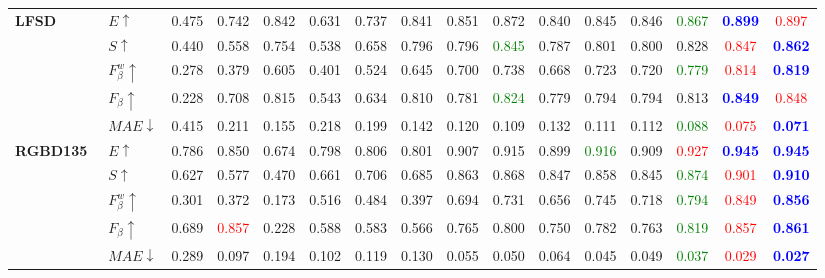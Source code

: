 \documentclass[runningheads]{llncs}
\begin{document}
\begin{table*}[tp]
{\begin{tabular}{lllccccccccccccc}
	\multirow{5}{*}{\textbf{LFSD}~\cite{LFS2017}}
&$E\uparrow$		&0.475	&0.742	&0.842	&0.631	&0.737	&0.841	&0.851	&0.872	&0.840	&0.845	&0.846	&\textcolor{green}{0.867}	&\textbf{\textcolor{blue}{0.899}}	&\textcolor{red}{0.897}\\
&$S\uparrow$	&0.440	&0.558	&0.754	&0.538	&0.658	&0.796	&0.796	&\textcolor{green}{0.845}	&0.787	&0.801	&0.800	&0.828	&\textcolor{red}{0.847}	&\textbf{\textcolor{blue}{0.862}}\\
&$F_{\beta}^w\uparrow$			&0.278	&0.379	&0.605	&0.401	&0.524	&0.645	&0.700	&0.738	&0.668	&0.723	&0.720	&\textcolor{green}{0.779}	&\textcolor{red}{0.814}	&\textbf{\textcolor{blue}{0.819}}\\
&$F_{\beta}\uparrow$	&0.228	&0.708	&0.815	&0.543	&0.634	&0.810	&0.781	&\textcolor{green}{0.824}	&0.779	&0.794	&0.794	&0.813	&\textbf{\textcolor{blue}{0.849}}	&\textcolor{red}{0.848}\\
&$MAE\downarrow$			&0.415	&0.211	&0.155	&0.218	&0.199	&0.142	&0.120	&0.109	&0.132	&0.111	&0.112	&\textcolor{green}{0.088}	&\textcolor{red}{0.075}	&\textbf{\textcolor{blue}{0.071}}\\
									\cmidrule(r){1-16}
	\multirow{5}{*}{\textbf{RGBD135}~\cite{3DDES}}
&$E\uparrow$		&0.786	&0.850	&0.674	&0.798	&0.806	&0.801	&0.907	&0.915	&0.899	&\textcolor{green}{0.916}	&0.909	&\textcolor{red}{0.927}	&\textbf{\textcolor{blue}{0.945}}	&\textbf{\textcolor{blue}{0.945}}\\
&$S\uparrow$	&0.627	&0.577	&0.470	&0.661	&0.706	&0.685	&0.863	&0.868	&0.847	&0.858	&0.845	&\textcolor{green}{0.874}	&\textcolor{red}{0.901}	&\textbf{\textcolor{blue}{0.910}}\\
&$F_{\beta}^w\uparrow$			&0.301	&0.372	&0.173	&0.516	&0.484	&0.397	&0.694	&0.731	&0.656	&0.745	&0.718	&\textcolor{green}{0.794}	&\textcolor{red}{0.849}	&\textbf{\textcolor{blue}{0.856}}\\
&$F_{\beta}\uparrow$	&0.689	&\textcolor{red}{0.857}	&0.228	&0.588	&0.583	&0.566	&0.765	&0.800	&0.750	&0.782	&0.763	&\textcolor{green}{0.819}	&\textcolor{red}{0.857}	&\textbf{\textcolor{blue}{0.861}}\\
&$MAE\downarrow$		&0.289	&0.097	&0.194	&0.102	&0.119	&0.130	&0.055	&0.050	&0.064	&0.045	&0.049	&\textcolor{green}{0.037}	&\textcolor{red}{0.029}	&\textbf{\textcolor{blue}{0.027}}\\
									\bottomrule
	\end{tabular}}


	\label{tab:comparison3D}
		\vspace{-0.5cm}
\end{table*}
\end{document}
